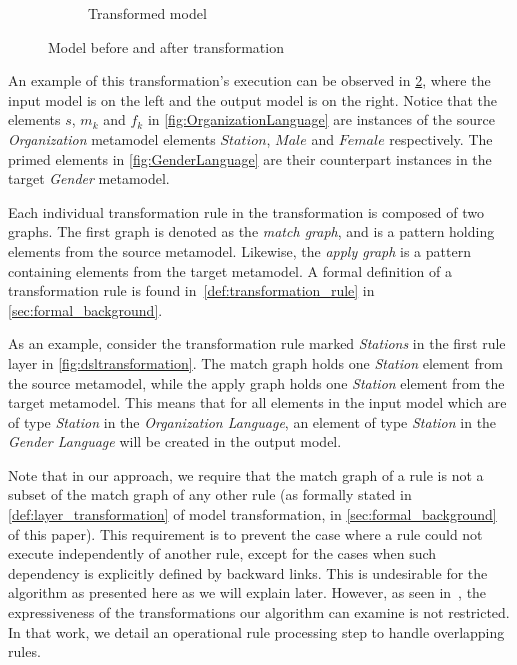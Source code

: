 \begin{figure}[htb]
\begin{subfigure}[b]{0.40\textwidth}
                \caption{Transformed model}
                \label{fig:police_gender}
        \end{subfigure}%
        \caption{Model before and after transformation}
        \label{fig:transformationexample}
\end{figure}

An example of this transformation's execution can be observed in \cref{fig:transformationexample}, where the input model is on the left and the output model is on the right. Notice that the elements $s$, $m_k$  and $f_k$ in \cref{fig:OrganizationLanguage} are instances of the source \emph{Organization} metamodel elements $Station$, $Male$ and $Female$ respectively. The primed elements in \cref{fig:GenderLanguage} are their counterpart instances in the target \emph{Gender} metamodel.

Each individual transformation rule in the transformation is composed of two graphs. The first graph
is denoted as the \emph{match graph}, and is a pattern holding elements from the
source metamodel. Likewise, the \emph{apply graph} is a pattern containing
elements from the target metamodel. A formal definition of a transformation rule is found in~\cref{def:transformation_rule} in \cref{sec:formal_background}.

As an example, consider the transformation rule marked \emph{Stations} in the
first rule layer in \cref{fig:dsltransformation}. The match graph holds
one \emph{Station} element from the source metamodel, while the apply graph
holds one \emph{Station} element from the target metamodel. This means that for all
elements in the input model which are of type \emph{Station} in the
\emph{Organization Language}, an element of type
\emph{Station} in the \emph{Gender Language} will be created in the output model.

Note that in our approach, we require that the match graph of a rule is not a subset of the match graph of any other rule (as formally stated in \cref{def:layer_transformation} of model transformation, in \cref{sec:formal_background} of this paper). This requirement is to prevent the case where a rule could not execute independently of another rule, except for the cases when such dependency is explicitly defined by backward links. This is undesirable for the algorithm as presented here as we will explain later. However, as seen in~\cite{conf/gg/SelimLCDO14}, the expressiveness of the transformations our algorithm can examine is not restricted. In that work, we detail an operational rule processing step to handle overlapping rules.

